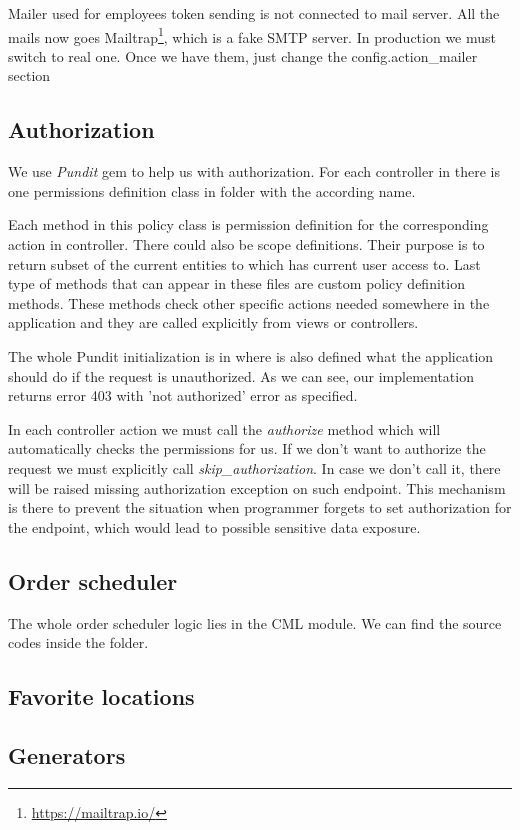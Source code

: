 		Mailer used for employees token sending is not connected to mail server. All the mails now goes Mailtrap\footnote{\url{https://mailtrap.io/}}, which is a fake SMTP server. In production we must switch to real one. Once we have them, just change the  config.action\_mailer section
		
	\label{implementation_authorization}\subsection {Authorization}
		We use \textit{Pundit} gem to help us with authorization. For each controller in  there is one permissions definition class in  folder with the according name.
		
		Each method in this policy class is permission definition for the corresponding action in controller. There could also be scope definitions. Their purpose is to return subset of the current entities to which has current user access to. Last type of methods that can appear in these files are custom policy definition methods. These methods check other specific actions needed somewhere in the application and they are called explicitly from views or controllers.
		
		The whole Pundit initialization is in  where is also defined what the application should do if the request is unauthorized. As we can see, our implementation returns error 403 with 'not authorized' error as specified.
		
		In each controller action we must call the \textit{authorize} method which will automatically checks the permissions for us. If we don't want to authorize the request we must explicitly call \textit{skip\_authorization}. In case we don't call it, there will be raised missing authorization exception on such endpoint. This mechanism is there to prevent the situation when programmer forgets to set authorization for the endpoint, which would lead to possible sensitive data exposure.

	\subsection{Order scheduler}
		The whole order scheduler logic lies in the CML module. We can find the source codes inside the  folder. 
	\subsection{Favorite locations}
	\subsection{Generators}
